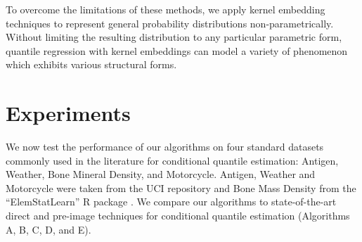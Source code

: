\documentclass[twoside]{article} \usepackage{aistats2017}
\theoremstyle{definition}
\theoremstyle{theorem}
\begin{document}
	To overcome the limitations of these methods, we apply kernel embedding techniques to represent general probability distributions non-parametrically. Without limiting the resulting distribution to any particular parametric form, quantile regression with kernel embeddings can model a variety of phenomenon which exhibits various structural forms.
	
% 
% 
	

	
\section{Experiments}
\label{sec:experiments}
		
	We now test the performance of our algorithms on four standard datasets commonly used in the literature for conditional quantile estimation: Antigen, Weather, Bone Mineral Density, and Motorcycle. Antigen, Weather and Motorcycle were taken from the UCI repository \citep{lichman2013uci} and Bone Mass Density from the ``ElemStatLearn'' R package \citep{hastie2005the}. We compare our algorithms to state-of-the-art direct and pre-image techniques for conditional quantile estimation (Algorithms A, B, C, D, and E).
	
%	
	
\end{document}
